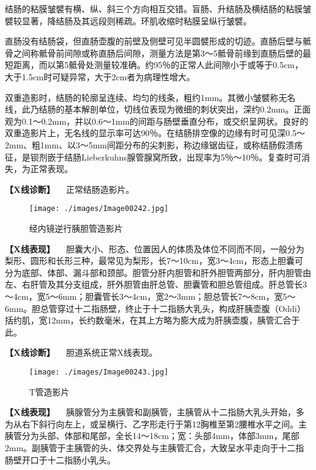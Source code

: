 结肠的粘膜皱襞有横、纵、斜三个方向相互交错。盲肠、升结肠及横结肠的粘膜皱襞较显著，降结肠及其远段则稀疏。环肌收缩时粘膜呈纵行皱襞。

直肠没有结肠袋，但直肠壶腹的前壁及侧壁可见半圆襞形成的切迹。直肠后壁与骶骨之间称骶骨前间隙或称直肠后间隙，测量方法是第3～5骶骨前缘到直肠后壁的最短距离，而以第5骶骨处测量较准确。约95％的正常人此间隙小于或等于0.5cm，大于1.5cm时可疑异常，大于2cm者为病理性增大。

双重造影时，结肠的轮廓呈连续、均匀的线条，粗约1mm。其微小皱襞称无名线，此乃结肠的基本解剖单位，切线位表现为微细的刺状突出，深约0.2mm。正面观为0.1～0.2mm，并以0.6～1mm的间距与肠壁垂直分布，或交织呈网状。良好的双重造影片上，无名线的显示率可达90％。在结肠排空像的边缘有时可见深0.5～2mm、粗1mm、以3～5mm间距分布的尖刺影，称边缘锯齿征，或称结肠假溃疡征，是钡剂嵌于结肠Lieberkuhns腺管腺窝所致，出现率为5％～10％。复查时可消失，为正常表现。

\textbf{【X线诊断】} 　正常结肠造影片。

\begin{figure}[!htbp]
 \centering
 \texttt{[image: ./images/Image00242.jpg]}
 \captionsetup{justification=centering}
 \caption{经内镜逆行胰胆管造影片}
 \label{fig5-1-10}
  \end{figure} 

\textbf{【X线表现】}
　胆囊大小、形态、位置因人的体质及体位不同而不同，一般分为梨形、圆形和长形三种，最常见为梨形，长7～10cm，宽3～4cm，形态上胆囊可分为底部、体部、漏斗部和颈部。胆管分肝内胆管和肝外胆管两部分，肝内胆管由左、右肝管及其分支组成，肝外胆管由肝总管、胆囊管和胆总管组成。肝总管长3～4cm，宽5～6mm；胆囊管长3～4cm，宽2～3mm；胆总管长7～8cm，宽5～6mm。胆总管穿过十二指肠壁，终止于十二指肠大乳头，构成肝胰壶腹（Oddi）括约肌，宽12mm，长约数毫米，在其上方略为膨大成为肝胰壶腹，胰管汇合于此。

\textbf{【X线诊断】} 　胆道系统正常X线表现。

\begin{figure}[!htbp]
 \centering
 \texttt{[image: ./images/Image00243.jpg]}
 \captionsetup{justification=centering}
 \caption{T管造影片}
 \label{fig5-1-11}
  \end{figure} 

\textbf{【X线表现】}
　胰腺管分为主胰管和副胰管，主胰管从十二指肠大乳头开始，多为从右下斜行向左上，或呈横行、乙字形走行于第12胸椎至第2腰椎水平之间。主胰管分为头部、体部和尾部，全长14～18cm；宽：头部4mm，体部3mm，尾部2mm。副胰管于主胰管的头、体交界处与主胰管汇合，大致呈水平走向于十二指肠壁开口于十二指肠小乳头。

